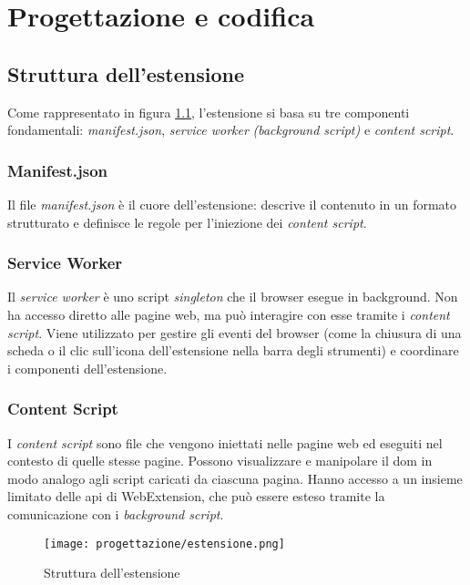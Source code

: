 \chapter{Progettazione e codifica}
\label{cap:progettazione-codifica}

\section{Struttura dell'estensione}
\label{sec:struttura-estensione}

Come rappresentato in figura \ref{fig:struttura_estensione}, l’estensione si basa su tre componenti fondamentali: \textit{manifest.json}, \textit{service worker} \textit{(background script)} e \textit{content script}.

\subsection{Manifest.json}

Il file \textit{manifest.json} è il cuore dell’estensione: descrive il contenuto in un formato strutturato e definisce le regole per l'iniezione dei \textit{content script}.

\subsection{Service Worker}

Il \textit{service worker} è uno script \textit{singleton} che il browser esegue in background. Non ha accesso diretto alle pagine web, ma può interagire con esse tramite i \textit{content script}. Viene utilizzato per gestire gli eventi del browser (come la chiusura di una scheda o il clic sull’icona dell’estensione nella barra degli strumenti) e coordinare i componenti dell'estensione.

\subsection{Content Script}

I \textit{content script} sono file che vengono iniettati nelle pagine web ed eseguiti nel contesto di quelle stesse pagine. Possono visualizzare e manipolare il \gls{dom} in modo analogo agli script caricati da ciascuna pagina. Hanno accesso a un insieme limitato delle \gls{api} di WebExtension, che può essere esteso tramite la comunicazione con i \textit{background script}.

\begin{figure}[H]
  \centering 
  \texttt{[image: progettazione/estensione.png]}
  \caption{Struttura dell'estensione}
  \label{fig:struttura_estensione}
\end{figure}

